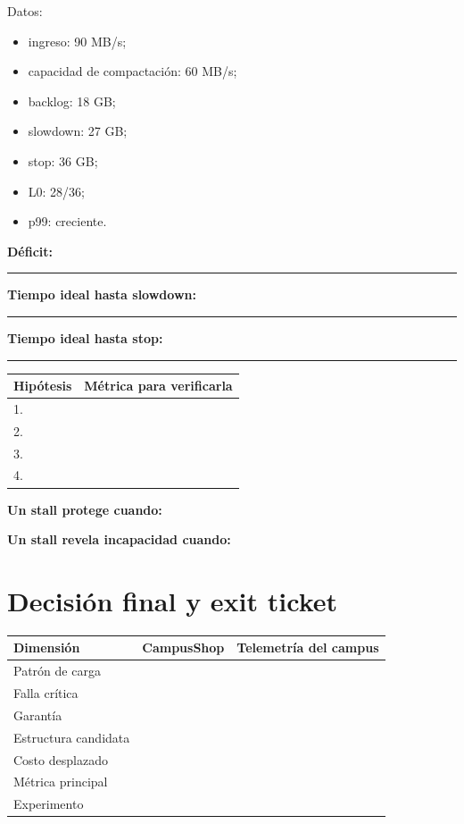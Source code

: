 \documentclass[variant=guia,cover=institutional,mode=print]{ua-engineering-v6-article}
\begin{document}
Datos:

\begin{itemize}
\item ingreso: 90 MB/s;
\item capacidad de compactación: 60 MB/s;
\item backlog: 18 GB;
\item slowdown: 27 GB;
\item stop: 36 GB;
\item L0: 28/36;
\item p99: creciente.
\end{itemize}

\textbf{Déficit:} \rule{0.28\textwidth}{0.4pt}

\textbf{Tiempo ideal hasta slowdown:} \rule{0.28\textwidth}{0.4pt}

\textbf{Tiempo ideal hasta stop:} \rule{0.28\textwidth}{0.4pt}

\begin{center}
\begin{tabular}{p{}p{}}
\toprule
Hipótesis & Métrica para verificarla \\
\midrule
1. & \\[0.9cm]
2. & \\[0.9cm]
3. & \\[0.9cm]
4. & \\[0.9cm]
\bottomrule
\end{tabular}
\end{center}

\textbf{Un stall protege cuando:}

\vspace{0.8cm}

\textbf{Un stall revela incapacidad cuando:}

\vspace{0.8cm}

\newpage
\section{Decisión final y exit ticket}

\begin{center}
\begin{tabular}{p{}p{}p{}}
\toprule
Dimensión & CampusShop & Telemetría del campus \\
\midrule
Patrón de carga & & \\[0.7cm]
Falla crítica & & \\[0.7cm]
Garantía & & \\[0.7cm]
Estructura candidata & & \\[0.7cm]
Costo desplazado & & \\[0.7cm]
Métrica principal & & \\[0.7cm]
Experimento & & \\[0.9cm]
\bottomrule
\end{tabular}
\end{center}
\end{document}

